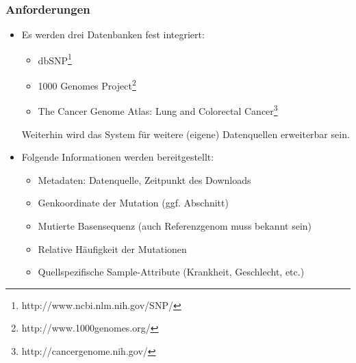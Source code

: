 \subsubsection{Anforderungen}
\begin{itemize}

\item Es werden drei Datenbanken fest integriert:
\begin{itemize}
\item dbSNP\footnote{\label{foot:1}http://www.ncbi.nlm.nih.gov/SNP/}
\item 1000 Genomes Project\footnote{\label{foot:2}http://www.1000genomes.org/}
\item The Cancer Genome Atlas: Lung and Colorectal Cancer\footnote{\label{foot:3}http://cancergenome.nih.gov/}
\end{itemize}
Weiterhin wird das System für weitere (eigene) Datenquellen erweiterbar sein.

\item Folgende Informationen werden bereitgestellt:
\begin{itemize}
\item Metadaten: Datenquelle, Zeitpunkt des Downloads
\item Genkoordinate der Mutation (ggf. Abschnitt)
\item Mutierte Basensequenz (auch Referenzgenom muss bekannt sein)
\item Relative Häufigkeit der Mutationen
\item Quellspezifische Sample-Attribute (Krankheit, Geschlecht, etc.)
\end{itemize}


\end{itemize}
